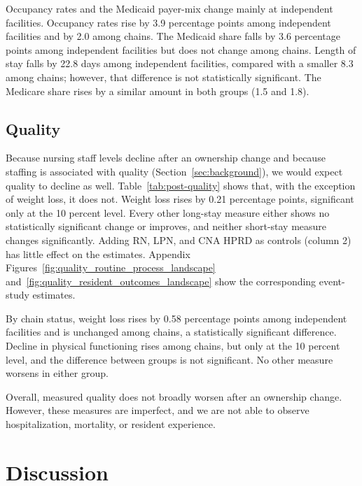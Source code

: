 \documentclass[12pt]{article}
\begin{document}
Occupancy rates and the Medicaid payer-mix change mainly at independent facilities. Occupancy rates rise by 3.9 percentage points among independent facilities and by 2.0 among chains. The Medicaid share falls by 3.6 percentage points among independent facilities but does not change among chains. Length of stay falls by 22.8 days among independent facilities, compared with a smaller 8.3 among chains; however, that difference is not statistically significant. The Medicare share rises by a similar amount in both groups (1.5 and 1.8).


\FloatBarrier

\subsection{Quality}

Because nursing staff levels decline after an ownership change and because staffing is associated with quality (Section~\ref{sec:background}), we would expect quality to decline as well. Table~\ref{tab:post-quality} shows that, with the exception of weight loss, it does not. Weight loss rises by 0.21 percentage points, significant only at the 10 percent level. Every other long-stay measure either shows no statistically significant change or improves, and neither short-stay measure changes significantly. Adding RN, LPN, and CNA HPRD as controls (column 2) has little effect on the estimates. Appendix Figures~\ref{fig:quality_routine_process_landscape} and~\ref{fig:quality_resident_outcomes_landscape} show the corresponding event-study estimates.

By chain status, weight loss rises by 0.58 percentage points among independent facilities and is unchanged among chains, a statistically significant difference. Decline in physical functioning rises among chains, but only at the 10 percent level, and the difference between groups is not significant. No other measure worsens in either group.

Overall, measured quality does not broadly worsen after an ownership change. However, these measures are imperfect, and we are not able to observe hospitalization, mortality, or resident experience.


\FloatBarrier

\section{Discussion}\label{sec:discussion}
\end{document}

